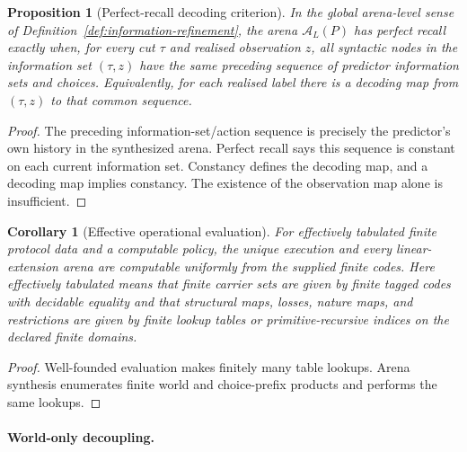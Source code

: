 \documentclass[11pt]{article}
\theoremstyle{plain}
\newtheorem{proposition}[theorem]{Proposition}
\newtheorem{corollary}[theorem]{Corollary}
\theoremstyle{definition}
\theoremstyle{remark}
\begin{document}
\begin{proposition}[Perfect-recall decoding criterion]
\label{prop:operational-perfect-recall}
In the global arena-level sense of Definition~\ref{def:information-refinement},
the arena $\mathcal A_L(P)$ has perfect recall exactly when, for every cut
$\tau$ and realised observation $z$, all syntactic nodes in the information set
$(\tau,z)$ have the same preceding sequence of predictor information sets and
choices. Equivalently, for each realised label there is a decoding map from
$(\tau,z)$ to that common sequence.
\end{proposition}

\begin{proof}
The preceding information-set/action sequence is precisely the predictor's own
history in the synthesized arena. Perfect recall says this sequence is constant
on each current information set. Constancy defines the decoding map, and a
decoding map implies constancy. The existence of the observation map alone is
insufficient.
\end{proof}

\begin{corollary}[Effective operational evaluation]
\label{cor:effective-operational}
For effectively tabulated finite protocol data and a computable policy, the
unique execution and every linear-extension arena are computable uniformly from
the supplied finite codes. Here effectively tabulated means that finite carrier
sets are given by finite tagged codes with decidable equality and that structural
maps, losses, nature maps, and restrictions are given by finite lookup tables or
primitive-recursive indices on the declared finite domains.
\end{corollary}

\begin{proof}
Well-founded evaluation makes finitely many table lookups. Arena synthesis
enumerates finite world and choice-prefix products and performs the same
lookups.
\end{proof}

\paragraph{World-only decoupling.}
\end{document}
